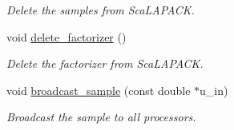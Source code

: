 \begin{DoxyCompactItemize}
\begin{DoxyCompactList}\small\item\em Delete the samples from Sca\-L\-A\-P\-A\-C\-K. \end{DoxyCompactList}\item 
\hypertarget{class_c_a_r_o_m_1_1_static_s_v_d_a4539c67bd0fc29dde6603173c6eaeffd}{void \hyperlink{class_c_a_r_o_m_1_1_static_s_v_d_a4539c67bd0fc29dde6603173c6eaeffd}{delete\-\_\-factorizer} ()}\label{class_c_a_r_o_m_1_1_static_s_v_d_a4539c67bd0fc29dde6603173c6eaeffd}

\begin{DoxyCompactList}\small\item\em Delete the factorizer from Sca\-L\-A\-P\-A\-C\-K. \end{DoxyCompactList}\item 
\hypertarget{class_c_a_r_o_m_1_1_static_s_v_d_a5dd0024af19c1c302b4b374a11b1bcd7}{void \hyperlink{class_c_a_r_o_m_1_1_static_s_v_d_a5dd0024af19c1c302b4b374a11b1bcd7}{broadcast\-\_\-sample} (const double $\ast$u\-\_\-in)}\label{class_c_a_r_o_m_1_1_static_s_v_d_a5dd0024af19c1c302b4b374a11b1bcd7}

\begin{DoxyCompactList}\small\item\em Broadcast the sample to all processors. \end{DoxyCompactList}\end{DoxyCompactItemize}
